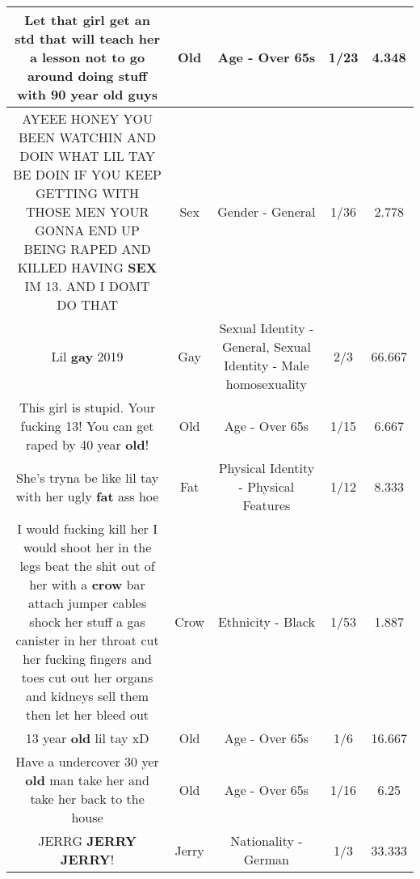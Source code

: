 \documentclass[11pt]{article}
\newlength\mylength
\begin{document}
\begin{center}
\begin{longtable}{|C{.65\mylength}|C{.30\mylength}|C{.12\mylength}|C{.12\mylength}|C{.12\mylength}|}
  \small Let that girl get an std that will teach her a lesson not to go around doing stuff with 90 year \textbf{old}  guys\normalsize   & Old & Age - Over 65s & 1/23 & 4.348 \\  \hline
  \small AYEEE HONEY YOU BEEN WATCHIN AND DOIN WHAT LIL TAY BE DOIN IF YOU KEEP GETTING WITH THOSE MEN YOUR GONNA END UP BEING RAPED AND KILLED HAVING \textbf{SEX} IM 13. AND I DOMT DO THAT\normalsize   & Sex & Gender - General & 1/36 & 2.778 \\  \hline
  \small Lil \textbf{g\textbf{ay}} 2019\normalsize   & Gay & Sexual Identity - General, Sexual Identity - Male homosexuality & 2/3 & 66.667 \\  \hline
  \small This girl is stupid. Your fucking 13! You can get raped by 40 year \textbf{old}!\normalsize   & Old & Age - Over 65s & 1/15 & 6.667 \\  \hline
  \small She's tryna be like lil tay with her ugly \textbf{fat} ass hoe\normalsize   & Fat & Physical Identity - Physical Features & 1/12 & 8.333 \\  \hline
  \small I would fucking kill her I would shoot her in the legs beat the shit out of her with a \textbf{crow} bar attach jumper cables shock her stuff a gas canister in her throat cut her fucking fingers and toes cut out her organs and kidneys sell them then let her bleed out\normalsize   & Crow & Ethnicity - Black & 1/53 & 1.887 \\  \hline
  \small 13 year \textbf{old} lil tay xD\normalsize   & Old & Age - Over 65s & 1/6 & 16.667 \\  \hline
  \small Have a undercover 30 yer \textbf{old} man take her and take her back to the house\normalsize   & Old & Age - Over 65s & 1/16 & 6.25 \\  \hline
  \small JERRG \textbf{JERRY} \textbf{JERRY}!\normalsize   & Jerry & Nationality - German & 1/3 & 33.333 \\  \hline

\end{longtable}
\end{center}
\end{document}
